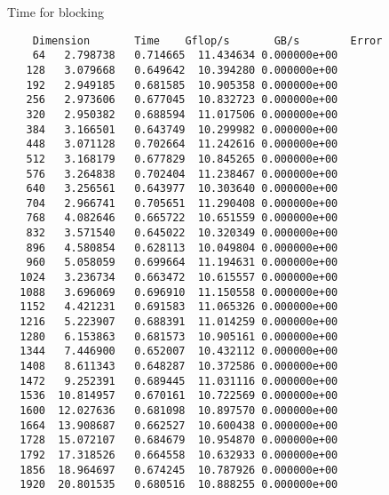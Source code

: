 \documentclass[titlepage]{article}
\begin{document}
Time for blocking
\begin{verbatim}
    Dimension       Time    Gflop/s       GB/s        Error
    64   2.798738   0.714665  11.434634 0.000000e+00
   128   3.079668   0.649642  10.394280 0.000000e+00
   192   2.949185   0.681585  10.905358 0.000000e+00
   256   2.973606   0.677045  10.832723 0.000000e+00
   320   2.950382   0.688594  11.017506 0.000000e+00
   384   3.166501   0.643749  10.299982 0.000000e+00
   448   3.071128   0.702664  11.242616 0.000000e+00
   512   3.168179   0.677829  10.845265 0.000000e+00
   576   3.264838   0.702404  11.238467 0.000000e+00
   640   3.256561   0.643977  10.303640 0.000000e+00
   704   2.966741   0.705651  11.290408 0.000000e+00
   768   4.082646   0.665722  10.651559 0.000000e+00
   832   3.571540   0.645022  10.320349 0.000000e+00
   896   4.580854   0.628113  10.049804 0.000000e+00
   960   5.058059   0.699664  11.194631 0.000000e+00
  1024   3.236734   0.663472  10.615557 0.000000e+00
  1088   3.696069   0.696910  11.150558 0.000000e+00
  1152   4.421231   0.691583  11.065326 0.000000e+00
  1216   5.223907   0.688391  11.014259 0.000000e+00
  1280   6.153863   0.681573  10.905161 0.000000e+00
  1344   7.446900   0.652007  10.432112 0.000000e+00
  1408   8.611343   0.648287  10.372586 0.000000e+00
  1472   9.252391   0.689445  11.031116 0.000000e+00
  1536  10.814957   0.670161  10.722569 0.000000e+00
  1600  12.027636   0.681098  10.897570 0.000000e+00
  1664  13.908687   0.662527  10.600438 0.000000e+00
  1728  15.072107   0.684679  10.954870 0.000000e+00
  1792  17.318526   0.664558  10.632933 0.000000e+00
  1856  18.964697   0.674245  10.787926 0.000000e+00
  1920  20.801535   0.680516  10.888255 0.000000e+00

\end{verbatim}
\end{document}
